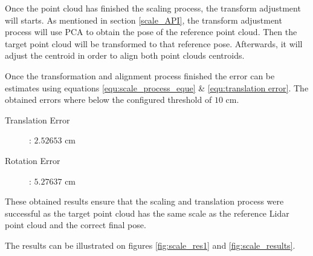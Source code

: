 \documentclass[12pt]{report}
\begin{document}
Once the point cloud has finished the scaling process, the transform adjustment will starts. 
As mentioned in section \ref{scale_API}, the transform adjustment process will use PCA to obtain the pose of the reference point cloud. Then the target point cloud will be transformed to that reference pose.
Afterwards, it will adjust the centroid in order to align both point clouds centroids.

Once the transformation and alignment process finished the error can be estimates using equations \ref{equ:scale_process_eque} \& \ref{equ:translation error}.
The obtained errors where below the configured threshold of $10$ cm.
\begin{description}
  \item[Translation Error]: $2.52653$ cm
  \item[Rotation Error]: $5.27637$ cm 
\end{description}

These obtained results ensure that the scaling and translation process were successful as the target point cloud has the same scale as the reference Lidar point cloud and the correct final pose.

The results can be illustrated on figures \ref{fig:scale_res1} and \ref{fig:scale_results}.
\end{document}
